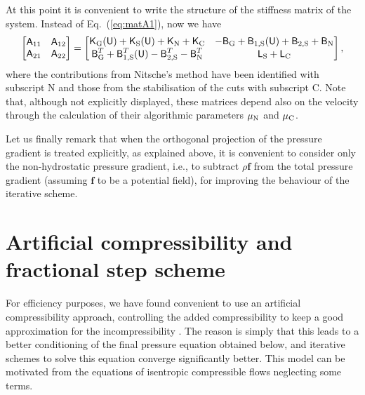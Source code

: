 \documentclass[11pt,a4paper,oneside,reqno]{amsart}
\newcommand{\Eq}[1]{(\ref{eq:#1})}
\def\mA{\hbox{{\sffamily A}}}
\def\mB{\hbox{{\sffamily B}}}
\def\mL{\hbox{{\sffamily L}}}
\def\mK{\hbox{{\sffamily K}}}
\def\mU{\hbox{{\sffamily U}}}
\begin{document}
At this point it is convenient to write the structure of the stiffness matrix of the system. Instead of Eq.~\Eq{matA1}, now we have
\begin{align}
 \left[ \begin{matrix} 
\mA_{11} & \mA_{12}  \cr
\mA_{21} & \mA_{22}
\end{matrix}\right] =
\left[ \begin{matrix} 
\mK_{\rm G}(\mU) +  \mK_{\rm S}(\mU)  +  \mK_{\rm N} +  \mK_{\rm C}
& - \mB_{\rm G} +\mB_{1,\rm S}(\mU) +\mB_{2,\rm S}  + \mB_{\rm N}\cr
\mB_{\rm G}^T +\mB^T_{1,\rm S}(\mU) - \mB^T_{2,\rm S} - \mB_{\rm N}^T & \mL_{\rm S} + \mL_{\rm C} 
\end{matrix}\right],\label{eq:matA2}
\end{align}
where the contributions from Nitsche's method have been identified with subscript {\rm N} and those from the stabilisation of the cuts with subscript {\rm C}. Note that, although not explicitly displayed, these matrices depend also on the velocity through the calculation of their algorithmic parameters $\mu_{\rm N}$ and $\mu_{\rm C}$.

Let us finally remark that when the orthogonal projection of the pressure gradient is treated explicitly, as explained above, it is convenient to consider only the non-hydrostatic pressure gradient, i.e., to subtract  $\rho {\bm f}$ from the total pressure gradient (assuming ${\bm f}$ to be a potential field), for improving the behaviour of the iterative scheme.

\section{Artificial compressibility and fractional step scheme}\label{sec:fs}

For efficiency purposes, we have found convenient to use an artificial compressibility approach, controlling the added compressibility to keep a good approximation for the incompressibility \cite{chorin3,guermond-minev-2015}. The reason is simply that this leads to a better conditioning of the final pressure equation obtained below, and iterative schemes to solve this equation converge significantly better. This model can be motivated from the equations of isentropic compressible flows neglecting some terms.
\end{document}
